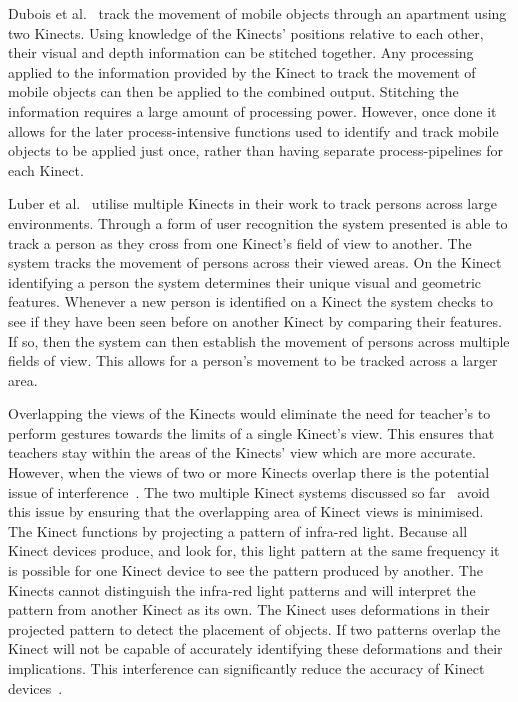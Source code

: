 \documentclass[link]{IWCOMP}
\begin{document}
Dubois et al.~\cite{Dubois2011} track the movement of mobile objects through an apartment using two Kinects.
Using knowledge of the Kinects' positions relative to each other, their visual and depth information can be stitched together.
Any processing applied to the information provided by the Kinect to track the movement of mobile objects can then be applied to the combined output.
Stitching the information requires a large amount of processing power.
However, once done it allows for the later process-intensive functions used to identify and track mobile objects to be applied just once, rather than having separate process-pipelines for each Kinect.

Luber et al.~\cite{Luber2011} utilise multiple Kinects in their work to track persons across large environments.
Through a form of user recognition the system presented is able to track a person as they cross from one Kinect's field of view to another.
The system tracks the movement of persons across their viewed areas.
On the Kinect identifying a person the system determines their unique visual and geometric features.
Whenever a new person is identified on a Kinect the system checks to see if they have been seen before on another Kinect by comparing their features.
If so, then the system can then establish the movement of persons across multiple fields of view.
This allows for a person's movement to be tracked across a larger area.

Overlapping the views of the Kinects would eliminate the need for teacher's to perform gestures towards the limits of a single Kinect's view.
This ensures that teachers stay within the areas of the Kinects' view which are more accurate.
However, when the views of two or more Kinects overlap there is the potential issue of interference~\cite{Satyavolu2012}.
The two multiple Kinect systems discussed so far~\cite{Dubois2011,Luber2011} avoid this issue by ensuring that the overlapping area of Kinect views is minimised.
The Kinect functions by projecting a pattern of infra-red light.
Because all Kinect devices produce, and look for, this light pattern at the same frequency it is possible for one Kinect device to see the pattern produced by another.
The Kinects cannot distinguish the infra-red light patterns and will interpret the pattern from another Kinect as its own.
The Kinect uses deformations in their projected pattern to detect the placement of objects.
If two patterns overlap the Kinect will not be capable of accurately identifying these deformations and their implications.
This interference can significantly reduce the accuracy of Kinect devices~\cite{Satyavolu2012}.
\end{document}
